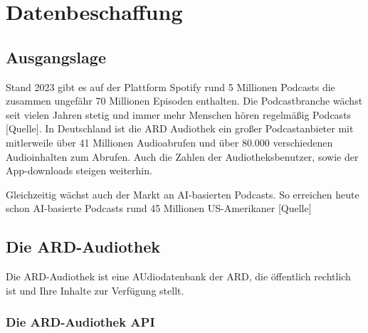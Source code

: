 \chapter{Datenbeschaffung}\label{ch:data}


\section{Ausgangslage}
 
Stand 2023 gibt es auf der Plattform Spotify rund 5 Millionen Podcasts die zusammen ungefähr 70 Millionen Episoden enthalten. Die Podcastbranche wächst seit vielen Jahren stetig und immer mehr Menschen hören regelmäßig Podcasts [Quelle].
In Deutschland ist die ARD Audiothek ein großer Podcastanbieter mit mitlerweile über 41 Millionen Audioabrufen und über 80.000 verschiedenen Audioinhalten zum Abrufen. Auch die Zahlen der Audiotheksbenutzer, sowie der App-downloads steigen weiterhin. 

Gleichzeitig wächst auch der Markt an AI-basierten Podcasts. So erreichen heute schon AI-basierte Podcasts rund 45 Millionen US-Amerikaner [Quelle]

\section{Die ARD-Audiothek}

Die ARD-Audiothek ist eine AUdiodatenbank der ARD, die öffentlich rechtlich ist und Ihre Inhalte zur Verfügung stellt.

\subsection{Die ARD-Audiothek API}

